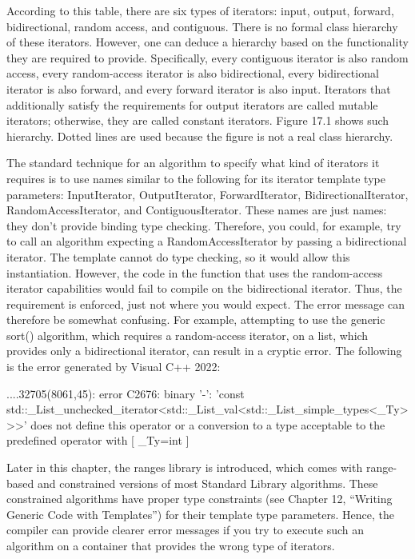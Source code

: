According to this table, there are six types of iterators: input, output, forward, bidirectional, random access, and contiguous. There is no formal class hierarchy of these iterators. However, one can deduce a hierarchy based on the functionality they are required to provide. Specifically, every contiguous iterator is also random access, every random-access iterator is also bidirectional, every bidirectional iterator is also forward, and every forward iterator is also input. Iterators that additionally satisfy the requirements for output iterators are called mutable iterators; otherwise, they are called constant iterators. Figure 17.1 shows such hierarchy. Dotted lines are used because the figure is not a real class hierarchy.


The standard technique for an algorithm to specify what kind of iterators it requires is to use names similar to the following for its iterator template type parameters: InputIterator, OutputIterator, ForwardIterator, BidirectionalIterator, RandomAccessIterator, and ContiguousIterator. These names are just names: they don’t provide binding type checking. Therefore, you could, for example, try to call an algorithm expecting a RandomAccessIterator by passing a bidirectional iterator. The template cannot do type checking, so it would allow this instantiation. However, the code in the function that uses the random-access iterator capabilities would fail to compile on the bidirectional iterator. Thus, the requirement is enforced, just not where you would expect. The error message can therefore be somewhat confusing. For example, attempting to use the generic sort() algorithm, which requires a random-access iterator, on a list, which provides only a bidirectional iterator, can result in a cryptic error. The following is the error generated by Visual C++ 2022:

\begin{shell}
...\MSVC{}.32705\algorithm(8061,45): error C2676: binary '-': 'const
std::_List_unchecked_iterator<std::_List_val<std::_List_simple_types<_Ty>>>' does
not define this operator or a conversion to a type acceptable to the
predefined operator
    with
    [
    _Ty=int
    ]
\end{shell}

Later in this chapter, the ranges library is introduced, which comes with range-based and constrained versions of most Standard Library algorithms. These constrained algorithms have proper type constraints (see Chapter 12, “Writing Generic Code with Templates”) for their template type parameters. Hence, the compiler can provide clearer error messages if you try to execute such an algorithm on a container that provides the wrong type of iterators.

